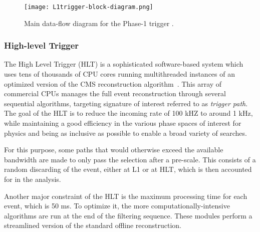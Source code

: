 \begin{figure}[thb]
  \centering
  \texttt{[image: L1trigger-block-diagram.png]}
  \caption{Main data-flow diagram for the Phase-1 \Lone trigger \cite{CMS-TDR-12}.}
  \label{fig:L1trigger-block-diagram}
\end{figure}

\subsubsection{High-level Trigger}
The High Level Trigger (HLT) is a sophisticated software-based system which uses tens of thousands of CPU cores
running multithreaded instances of an optimized version of the CMS reconstruction algorithm~\cite{CMS-TRG-12-001}.
This array of commercial CPUs manages the full event reconstruction through several sequential algorithms,
targeting signature of interest referred to as \textit{trigger path}.
The goal of the HLT is to reduce the incoming \Lone rate of 100 kHZ to around 1 kHz,
while maintaining a good efficiency in the various phase spaces of interest for physics
and being as inclusive as possible to enable a broad variety of searches.

For this purpose, some paths that would otherwise exceed the available bandwidth are made to only pass the selection after a pre-scale.
This consists of a random discarding of the event, either at L1 or at HLT, which is then accounted for in the analysis.

Another major constraint of the HLT is the maximum processing time for each event, which is 50 ms.
To optimize it, the more computationally-intensive algorithms are run at the end of the filtering sequence.
These modules perform a streamlined version of the standard offline reconstruction.
